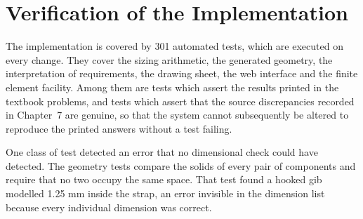 \section{Verification of the Implementation}
The implementation is covered by 301 automated tests, which are executed on every change. They cover the sizing arithmetic, the generated geometry, the interpretation of requirements, the drawing sheet, the web interface and the finite element facility. Among them are tests which assert the results printed in the textbook problems, and tests which assert that the source discrepancies recorded in Chapter~7 are genuine, so that the system cannot subsequently be altered to reproduce the printed answers without a test failing.

One class of test detected an error that no dimensional check could have detected. The geometry tests compare the solids of every pair of components and require that no two occupy the same space. That test found a hooked gib modelled 1.25 mm inside the strap, an error invisible in the dimension list because every individual dimension was correct.
